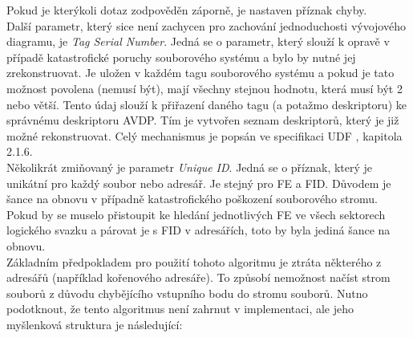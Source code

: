 Pokud je kterýkoli dotaz zodpověděn záporně, je nastaven příznak chyby.\\
Další parametr, který sice není zachycen pro zachování jednoduchosti vývojového diagramu, je \textit{Tag Serial Number}. Jedná se o parametr, který slouží k opravě v případě katastrofické poruchy souborového systému a bylo by nutné jej zrekonstruovat. Je uložen v každém tagu souborového systému a pokud je tato možnost povolena (nemusí být), mají všechny stejnou hodnotu, která musí být 2 nebo větší. Tento údaj slouží k přiřazení daného tagu (a potažmo deskriptoru) ke správnému deskriptoru AVDP. Tím je vytvořen seznam deskriptorů, který je již možné rekonstruovat. Celý mechanismus je popsán ve specifikaci UDF \cite{osta-udf-0201}, kapitola 2.1.6.\\
Několikrát zmiňovaný je parametr \textit{Unique ID}. Jedná se o příznak, který je unikátní pro každý soubor nebo adresář. Je stejný pro FE a FID. Důvodem je šance na obnovu v případně katastrofického poškození souborového stromu. Pokud by se muselo přistoupit ke hledání jednotlivých FE ve všech sektorech logického svazku a párovat je s FID v adresářích, toto by byla jediná šance na obnovu.\\
Základním předpokladem pro použití tohoto algoritmu je ztráta některého z adresářů (například kořenového adresáře). To způsobí nemožnost načíst strom souborů z důvodu chybějícího vstupního bodu do stromu souborů. Nutno podotknout, že tento algoritmus není zahrnut v implementaci, ale jeho myšlenková struktura je následující:
